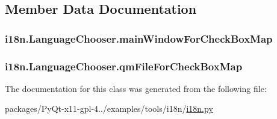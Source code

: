 \subsection{Member Data Documentation}
\hypertarget{classi18n_1_1LanguageChooser_ac67325e1ecf9cbf7912222e2d1f44e91}{}
\subsubsection[{main\+Window\+For\+Check\+Box\+Map}]{\setlength{\rightskip}{0pt plus 5cm}i18n.\+Language\+Chooser.\+main\+Window\+For\+Check\+Box\+Map}\label{classi18n_1_1LanguageChooser_ac67325e1ecf9cbf7912222e2d1f44e91}
\hypertarget{classi18n_1_1LanguageChooser_a1bd55c23724025de1514a5dc18b82a41}{}
\subsubsection[{qm\+File\+For\+Check\+Box\+Map}]{\setlength{\rightskip}{0pt plus 5cm}i18n.\+Language\+Chooser.\+qm\+File\+For\+Check\+Box\+Map}\label{classi18n_1_1LanguageChooser_a1bd55c23724025de1514a5dc18b82a41}


The documentation for this class was generated from the following file\+:\begin{DoxyCompactItemize}
\item 
packages/\+Py\+Qt-\/x11-\/gpl-\/4../examples/tools/i18n/\hyperlink{i18n_8py}{i18n.\+py}\end{DoxyCompactItemize}

